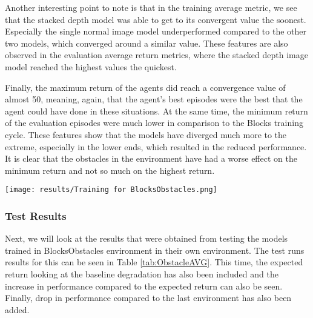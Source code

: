 Another interesting point to note is that in the training average metric, we see that 
the stacked depth model was able to get to 
its convergent value the soonest. Especially the single normal image model underperformed 
compared to the other two models, which converged around a similar value. These features 
are also observed in the evaluation average return metrics, where the stacked depth 
image model reached the highest values the quickest. 

Finally, the maximum return of the agents did reach a convergence value of almost 50, 
meaning, again, that the agent's best episodes were the best that the agent could have 
done in these situations. At the same time, the minimum return of the evaluation 
episodes were much lower in comparison to the Blocks training cycle. These features 
show that the models have diverged much more to the extreme, especially in the lower ends, 
which resulted in the reduced performance. It is clear that the obstacles in the 
environment have had a worse effect on the minimum return and not so much on the 
highest return. \newline

\begin{Figure}
    \centering
    \texttt{[image: results/Training for BlocksObstacles.png]}
    \label{im:ObstaclesTraining}
\end{Figure}

\subsubsection{Test Results}
Next, we will look at the results that were obtained from testing the models trained in 
BlocksObstacles environment in their own environment.
The test runs results for this can be seen in Table \ref{tab:ObstacleAVG}. This time, 
the expected return looking at the baseline degradation has also been included and the 
increase in performance compared to the expected return can also be seen. Finally, 
drop in performance compared to the last environment has also been added. 

